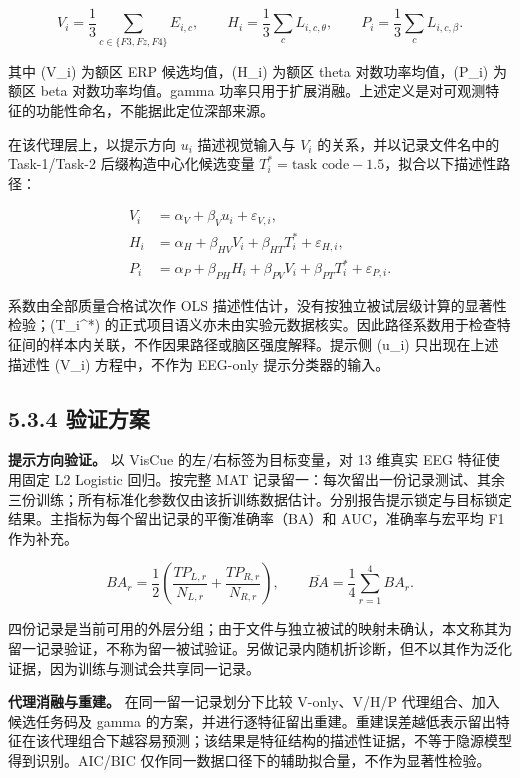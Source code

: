 \[
V_i=\frac{1}{3}\sum_{c\in\{F3,Fz,F4\}}E_{i,c},\qquad
H_i=\frac{1}{3}\sum_c L_{i,c,\theta},\qquad
P_i=\frac{1}{3}\sum_c L_{i,c,\beta}.
\]

其中 (V\_i) 为额区 ERP 候选均值，(H\_i) 为额区 theta
对数功率均值，(P\_i) 为额区 beta 对数功率均值。gamma
功率只用于扩展消融。上述定义是对可观测特征的功能性命名，不能据此定位深部来源。

在该代理层上，以提示方向 \(u_i\) 描述视觉输入与 \(V_i\)
的关系，并以记录文件名中的 Task-1/Task-2 后缀构造中心化候选变量
\(T_i^*=\text{task code}-1.5\)，拟合以下描述性路径：

\[
\begin{aligned}
V_i &= \alpha_V+\beta_Vu_i+\varepsilon_{V,i},\\
H_i &= \alpha_H+\beta_{HV}V_i+\beta_{HT}T_i^*+\varepsilon_{H,i},\\
P_i &= \alpha_P+\beta_{PH}H_i+\beta_{PV}V_i+\beta_{PT}T_i^*+\varepsilon_{P,i}.
\end{aligned}
\]

系数由全部质量合格试次作 OLS
描述性估计，没有按独立被试层级计算的显著性检验；(T\_i\^{}*)
的正式项目语义亦未由实验元数据核实。因此路径系数用于检查特征间的样本内关联，不作因果路径或脑区强度解释。提示侧
(u\_i) 只出现在上述描述性 (V\_i) 方程中，不作为 EEG-only
提示分类器的输入。

\hypertarget{ux9a8cux8bc1ux65b9ux6848}{%
\subsection{5.3.4 验证方案}\label{ux9a8cux8bc1ux65b9ux6848}}

\textbf{提示方向验证。} 以 VisCue 的左/右标签为目标变量，对 13 维真实
EEG 特征使用固定 L2 Logistic 回归。按完整 MAT
记录留一：每次留出一份记录测试、其余三份训练；所有标准化参数仅由该折训练数据估计。分别报告提示锁定与目标锁定结果。主指标为每个留出记录的平衡准确率（BA）和
AUC，准确率与宏平均 F1 作为补充。

\[
BA_r=\frac{1}{2}\left(\frac{TP_{L,r}}{N_{L,r}}+\frac{TP_{R,r}}{N_{R,r}}\right),\qquad
\overline{BA}=\frac{1}{4}\sum_{r=1}^{4}BA_r.
\]

四份记录是当前可用的外层分组；由于文件与独立被试的映射未确认，本文称其为留一记录验证，不称为留一被试验证。另做记录内随机折诊断，但不以其作为泛化证据，因为训练与测试会共享同一记录。

\textbf{代理消融与重建。} 在同一留一记录划分下比较 V-only、V/H/P
代理组合、加入候选任务码及 gamma
的方案，并进行逐特征留出重建。重建误差越低表示留出特征在该代理组合下越容易预测；该结果是特征结构的描述性证据，不等于隐源模型得到识别。AIC/BIC
仅作同一数据口径下的辅助拟合量，不作为显著性检验。

